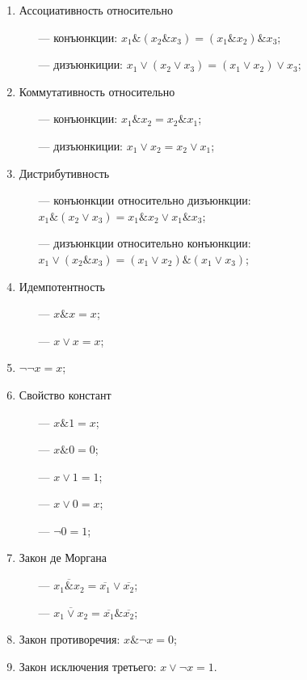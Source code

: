 \documentclass[a4paper,12pt]{report}
\begin{document}
	\begin{enumerate}
		\item Ассоциативность относительно
			\begin{itemize}
				\item[---] конъюнкции: $ x_1 \& (x_2 \& x_3) = (x_1 \& x_2) \& x_3 $;
				\item[---] дизъюнкиции: $ x_1 \vee (x_2 \vee x_3) = (x_1 \vee x_2)
					\vee x_3 $;
			\end{itemize}
		\item Коммутативность относительно
			\begin{itemize}
				\item[---] конъюнкции: $ x_1 \& x_2 = x_2 \& x_1 $;
				\item[---] дизъюнкиции: $ x_1 \vee x_2 = x_2 \vee x_1 $;
			\end{itemize}
		\item Дистрибутивность
			\begin{itemize}
				\item[---] конъюнкции относительно дизъюнкции: $ x_1 \& (x_2 \vee x_3)
					= x_1 \& x_2 \vee x_1 \& x_3 $;
				\item[---] дизъюнкции относительно конъюнкции: $ x_1 \vee (x_2 \& x_3)
					= (x_1 \vee x_2) \& (x_1 \vee x_3) $;
			\end{itemize}
		\item Идемпотентность
			\begin{itemize}
				\item[---] $ x \& x = x $;
				\item[---] $ x \vee x = x $;
			\end{itemize}
		\item $ \neg \neg x = x $;
		\item Свойство констант
			\begin{itemize}
				\item[---] $ x \& 1 = x $;
				\item[---] $ x \& 0 = 0 $;
				\item[---] $ x \vee 1 = 1 $;
				\item[---] $ x \vee 0 = x $;
				\item[---] $ \neg 0 = 1 $;
			\end{itemize}
		\item Закон де Моргана
			\begin{itemize}
				\item[---] $ \overline{x_1 \& x_2} = \overline{x_1} \vee
					\overline{x_2} $;
				\item[---] $ \overline{x_1 \vee x_2} = \overline{x_1} \&
					\overline{x_2} $;
			\end{itemize}
		\item Закон противоречия: $ x \& \neg x = 0 $;
		\item Закон исключения третьего: $ x \vee \neg x = 1 $.
	\end{enumerate}
\end{document}
